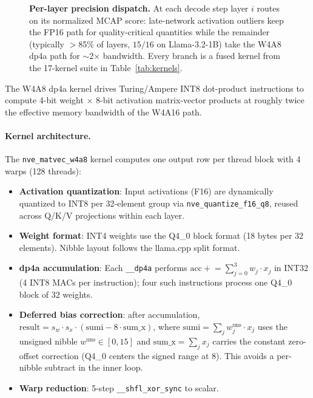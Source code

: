 \documentclass{article}
\begin{document}
\begin{figure}[H]
{%
}
\caption{\textbf{Per-layer precision dispatch.} At each decode step layer $i$ routes on
its normalized MCAP score: late-network activation outliers keep the FP16 path for
quality-critical quantities while the remainder (typically $>$85\% of layers, $15/16$
on Llama-3.2-1B) take the W4A8 dp4a path for $\sim$2$\times$ bandwidth. Every branch is a fused kernel
from the 17-kernel suite in Table~\ref{tab:kernels}.}
\label{fig:precision_dispatch}
\end{figure}

The W4A8 dp4a kernel drives Turing/Ampere INT8 dot-product instructions to
compute 4-bit weight $\times$ 8-bit activation matrix-vector products at roughly twice
the effective memory bandwidth of the W4A16 path.

\paragraph{Kernel architecture.} The \texttt{nve\_matvec\_w4a8} kernel computes one output
row per thread block with 4 warps (128 threads):

\begin{itemize}[leftmargin=*, itemsep=1pt]
\item \textbf{Activation quantization}: Input activations (F16) are dynamically quantized
  to INT8 per 32-element group via \texttt{nve\_quantize\_f16\_q8}, reused across Q/K/V
  projections within each layer.
\item \textbf{Weight format}: INT4 weights use the Q4\_0 block format (18 bytes per 32
  elements). Nibble layout follows the llama.cpp split format.
\item \textbf{dp4a accumulation}: Each \texttt{\_\_dp4a} performs
  $\text{acc} \mathrel{+}= \sum_{j=0}^{3} w_j \cdot x_j$ in INT32 (4 INT8 MACs per
  instruction); four such instructions process one Q4\_0 block of 32 weights.
\item \textbf{Deferred bias correction}: after accumulation,
  $\text{result} = s_w \cdot s_x \cdot (\text{sumi} - 8 \cdot \text{sum\_x})$,
  where $\text{sumi} = \sum_j w_j^{\text{uns}} \cdot x_j$ uses the unsigned nibble
  $w^{\text{uns}} \in [0, 15]$ and $\text{sum\_x} = \sum_j x_j$ carries the constant
  zero-offset correction (Q4\_0 centers the signed range at 8). This avoids a
  per-nibble subtract in the inner loop.
\item \textbf{Warp reduction}: 5-step \texttt{\_\_shfl\_xor\_sync} to scalar.
\end{itemize}
\end{document}
